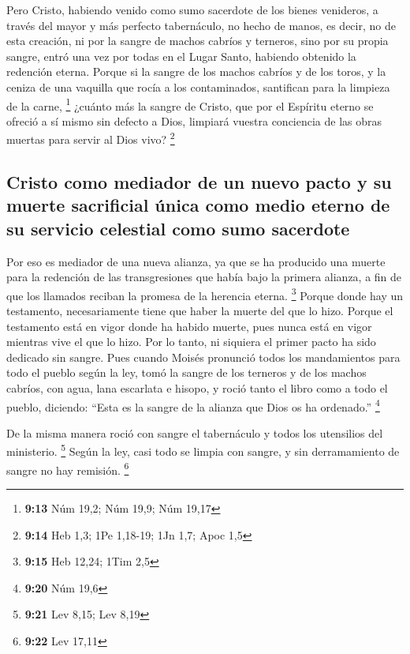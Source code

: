 \begin{paracol}{2}
 Pero Cristo, habiendo venido como sumo sacerdote de los
bienes venideros, a través del mayor y más perfecto tabernáculo, no
hecho de manos, es decir, no de esta creación,  ni por la
sangre de machos cabríos y terneros, sino por su propia sangre, entró
una vez por todas en el Lugar Santo, habiendo obtenido la redención
eterna.  Porque si la sangre de los machos cabríos y de
los toros, y la ceniza de una vaquilla que rocía a los contaminados,
santifican para la limpieza de la carne, \footnote{\textbf{9:13} Núm
  19,2; Núm 19,9; Núm 19,17}  ¿cuánto más la sangre de
Cristo, que por el Espíritu eterno se ofreció a sí mismo sin defecto a
Dios, limpiará vuestra conciencia de las obras muertas para servir al
Dios vivo? \footnote{\textbf{9:14} Heb 1,3; 1Pe 1,18-19; 1Jn 1,7; Apoc
  1,5}

\hypertarget{cristo-como-mediador-de-un-nuevo-pacto-y-su-muerte-sacrificial-uxfanica-como-medio-eterno-de-su-servicio-celestial-como-sumo-sacerdote}{%
\subsection{Cristo como mediador de un nuevo pacto y su muerte
sacrificial única como medio eterno de su servicio celestial como sumo
sacerdote}\label{cristo-como-mediador-de-un-nuevo-pacto-y-su-muerte-sacrificial-uxfanica-como-medio-eterno-de-su-servicio-celestial-como-sumo-sacerdote}}

 Por eso es mediador de una nueva alianza, ya que se ha
producido una muerte para la redención de las transgresiones que había
bajo la primera alianza, a fin de que los llamados reciban la promesa de
la herencia eterna. \footnote{\textbf{9:15} Heb 12,24; 1Tim 2,5}
 Porque donde hay un testamento, necesariamente tiene que
haber la muerte del que lo hizo.  Porque el testamento
está en vigor donde ha habido muerte, pues nunca está en vigor mientras
vive el que lo hizo.  Por lo tanto, ni siquiera el primer
pacto ha sido dedicado sin sangre.  Pues cuando Moisés
pronunció todos los mandamientos para todo el pueblo según la ley, tomó
la sangre de los terneros y de los machos cabríos, con agua, lana
escarlata e hisopo, y roció tanto el libro como a todo el pueblo,
 diciendo: ``Esta es la sangre de la alianza que Dios os
ha ordenado.'' \footnote{\textbf{9:20} Núm 19,6}

 De la misma manera roció con sangre el tabernáculo y
todos los utensilios del ministerio. \footnote{\textbf{9:21} Lev 8,15;
  Lev 8,19}  Según la ley, casi todo se limpia con
sangre, y sin derramamiento de sangre no hay remisión. \footnote{\textbf{9:22}
  Lev 17,11}


\end{paracol}
